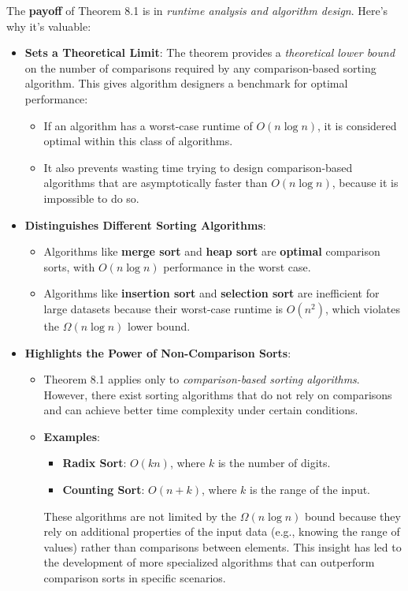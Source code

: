 \documentclass{article}
\begin{document}
The \textbf{payoff} of Theorem 8.1 is in \textit{runtime analysis and algorithm design}. Here’s why it’s valuable:

\begin{itemize}
    \item \textbf{Sets a Theoretical Limit}: The theorem provides a \textit{theoretical lower bound} on the number of comparisons required by any comparison-based sorting algorithm. This gives algorithm designers a benchmark for optimal performance:
        \begin{itemize}
            \item If an algorithm has a worst-case runtime of \( O(n \log n) \), it is considered optimal within this class of algorithms.
            \item It also prevents wasting time trying to design comparison-based algorithms that are asymptotically faster than \( O(n \log n) \), because it is impossible to do so.
        \end{itemize}
    \item \textbf{Distinguishes Different Sorting Algorithms}:
        \begin{itemize}
            \item Algorithms like \textbf{merge sort} and \textbf{heap sort} are \textbf{optimal} comparison sorts, with \( O(n \log n) \) performance in the worst case.
            \item Algorithms like \textbf{insertion sort} and \textbf{selection sort} are inefficient for large datasets because their worst-case runtime is \( O(n^2) \), which violates the \( \Omega(n \log n) \) lower bound.
        \end{itemize}
    \item \textbf{Highlights the Power of Non-Comparison Sorts}:
        \begin{itemize}
            \item Theorem 8.1 applies only to \textit{comparison-based sorting algorithms}. However, there exist sorting algorithms that do not rely on comparisons and can achieve better time complexity under certain conditions.
            \item \textbf{Examples}:
                \begin{itemize}
                    \item \textbf{Radix Sort}: \( O(kn) \), where \( k \) is the number of digits.
                    \item \textbf{Counting Sort}: \( O(n + k) \), where \( k \) is the range of the input.
                \end{itemize}
            These algorithms are not limited by the \( \Omega(n \log n) \) bound because they rely on additional properties of the input data (e.g., knowing the range of values) rather than comparisons between elements. This insight has led to the development of more specialized algorithms that can outperform comparison sorts in specific scenarios.
        \end{itemize}
\end{itemize}
\end{document}
